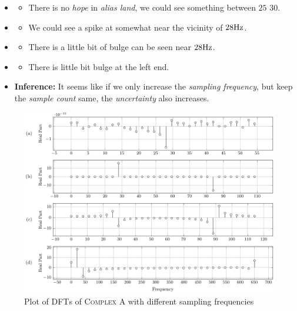 \documentclass[../../course]{subfiles}
\begin{document}
\begin{itemize} [label=]

    \item \sampFreqMuchLess
        \begin{itemize} [label=]
            \item There is no \emph{hope} in \emph{alias land}, we could see
                something between $25$ $30$.
        \end{itemize}

    \item \sampFreqNorm
        \begin{itemize} [label=]
            \item We could see a spike at somewhat near the vicinity of $\freqXOne \si{Hz}$.
        \end{itemize}

    \item \sampFreqSligGreat
        \begin{itemize} [label=]
            \item There is a little bit of bulge can be seen near $\freqXOne \si{Hz}$.
        \end{itemize}

    \item \sampFreqMuchGreat
        \begin{itemize} [label=]
            \item There is little bit bulge at the left end.
        \end{itemize}

    \item \textbf{Inference:} It seems like if we only increase the \emph{sampling frequency},
        but keep the \emph{sample count} same, the \emph{uncertainty} also increases.

\end{itemize}

\vfill

\begin{figure} [H]
    \centering
     {
        \includegraphics[height = 0.8\textheight] {tikzpics/plotDftComplexA32.pdf}
    }
     {Plot of \textsc{DFT}s of \textsc{Complex A} with different sampling frequencies}
    \label{plt:dftComplexA}
\end{figure}
\end{document}
